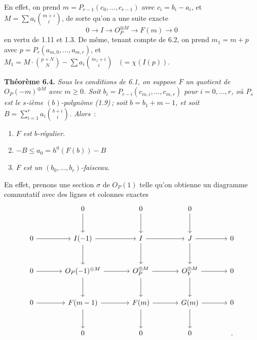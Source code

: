 
En
effet, on prend $m=P_{r-1}(c_0,\ldots,c_{r-1})$ avec $c_i=b_i-a_i$, et $M=\sum a_i\binom{m+i}{i}$, de sorte qu'on a une suite exacte
\[
   0\longrightarrow I\longrightarrow {O}_P^{\oplus M}
   \longrightarrow F(m)\longrightarrow0
\]
en vertu de 1.11 et 1.3. De m\^eme, tenant compte de 6.2, on prend $m_1=m+p$ avec $p=P_r(a_{m,0},\ldots,a_{m,r})$, et $M_1=M\cdot\binom{p+N}{N}-\sum a_i\binom{m_1+i}{i}\quad(=\chi(I(p))$.

\textbf{Th\'eor\`eme 6.4.} \emph{Sous les conditions de 6.1, on suppose $F$ un quotient de ${O}_P(-m)^{\oplus M}$ avec $m\ge0$. Soit $b_i=P_{r-i}(c_{m,i},\ldots,c_{m,r})$ pour $i=0,\ldots,r$, o\`u $P_s$ est le $s$-i\`eme $(b)$-polyn\^ome (1.9)\,; soit $b=b_1+m-1$, et soit $B=\sum_{i=1}^{r} a_i\binom{b+i}{i}$. Alors}~:
\begin{enumerate}[label=(\roman*)]
\item \emph{$F$ est $b$-r\'egulier.}
\item \emph{$-B\le a_0=h^0(F(b))-B$}
\item \emph{$F$ est un $(b_0,\ldots,b_r)$-faisceau.}
\end{enumerate}

En effet, prenons une section $\sigma$ de ${O}_P(1)$ telle qu'on obtienne un diagramme commutatif avec des lignes et colonnes exactes
\[
\begin{tikzcd}[column sep=large,row sep=large]
&0 \arrow[d]&0 \arrow[d]&0 \arrow[d]&\\
0 \arrow[r]&I(-1) \arrow[r] \arrow[d]&I \arrow[r] \arrow[d]&J \arrow[r] \arrow[d]&0\\
0 \arrow[r]&{O}_P(-1)^{\oplus M} \arrow[r] \arrow[d]&{O}_P^{\oplus M} \arrow[r] \arrow[d]&{O}_Y^{\oplus M} \arrow[r] \arrow[d]&0\\
0 \arrow[r]&F(m-1) \arrow[r] \arrow[d]&F(m) \arrow[r] \arrow[d]&G(m) \arrow[r] \arrow[d]&0\\
&0&0&0&.
\end{tikzcd}
\]

